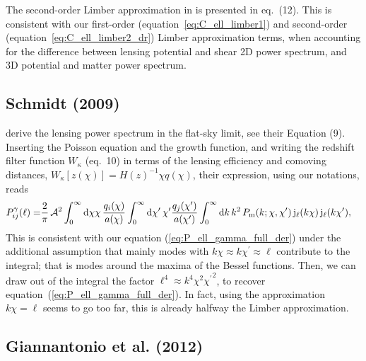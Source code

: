 \documentclass[fleqn,usenatbib]{mnras} %
\newcommand{\pref}{{\cal A}}
\begin{document}
\begin{appendix}
The second-order Limber approximation in \cite{2008PhRvD..78l3506L} is
presented in eq.~(12). This is consistent with our first-order
(equation~\ref{eq:C_ell_limber1}) and second-order
(equation~\ref{eq:C_ell_limber2_dr}) Limber approximation terms, when
accounting for the difference between lensing potential and shear 2D power
spectrum, and 3D potential and matter power spectrum.


\subsection{Schmidt (2009)}
\label{sec:schmidt08}

\cite{2008PhRvD..78d3002S} derive the lensing power spectrum in the flat-sky
limit, see their Equation (9). Inserting the Poisson equation and the
growth function, and writing the redshift filter function
$W_\kappa$ (eq.~10) in terms of the lensing efficiency and comoving distances,
$W_\kappa[z(\chi)] = H(z)^{-1} \chi q(\chi)$, their expression, using our
notations, reads
%
\begin{align}
  P_{ij}^\gamma(\ell) = & \frac 2 \pi \, \pref^2
                 \int_{0}^\infty {\rm d} \chi \chi \, \frac{q_i(\chi)}{a(\chi)}
                \int_{0}^\infty {\rm d} \chi^\prime\, \chi^\prime
                \frac{q_j(\chi^\prime)}{a(\chi^\prime)}
                \int_0^\infty {\rm d} k \, k^2 \, P_{\rm m}(k; \chi, \chi^\prime) \,
                {\rm j}_\ell(k \chi) \, {\rm j}_\ell(k \chi^\prime) ,
  \label{eq:P_ell_gamma}
\end{align}
%
This is consistent with our equation (\ref{eq:P_ell_gamma_full_der}) under the
additional assumption that mainly modes with $k \chi \approx k \chi^\prime
\approx \ell$ contribute to the integral; that is modes around the maxima of
the Bessel functions. Then, we can draw out of the integral the factor $\ell^4
\approx k^4 \chi^2 {\chi^\prime}^2$, to recover
equation~(\ref{eq:P_ell_gamma_full_der}).
In fact, using the approximation $k \chi = \ell$ seems to go too far, this is
already halfway the Limber approximation.

\subsection{Giannantonio et al. (2012)}
\label{sec:giannantonio12}


\end{appendix}
\end{document}
